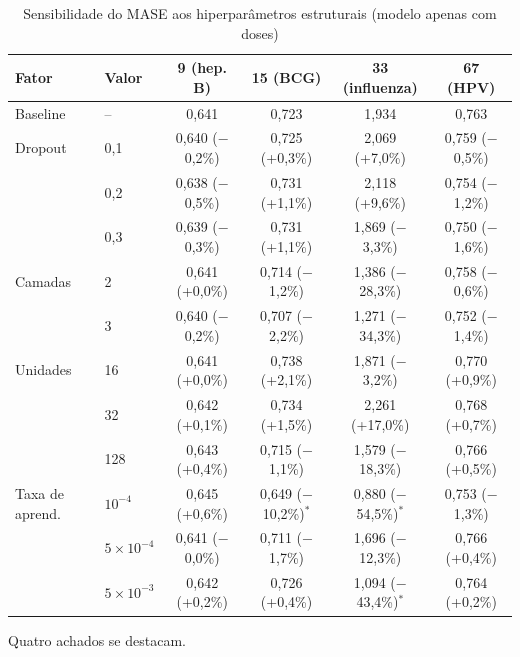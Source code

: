 \documentclass[
    12pt,
    openright,
    oneside,
    a4paper,
    english,
    brazil
]{abntex2}
\begin{document}
\begin{table}[htb]
  \centering
  \caption{Sensibilidade do MASE aos hiperparâmetros estruturais (modelo apenas com doses)}
  \label{tab:sens_estrutural}
  \footnotesize
  \setlength{\tabcolsep}{3pt}
  \begin{tabular}{llcccc}
    \toprule
    \textbf{Fator} & \textbf{Valor} & \textbf{9 (hep. B)} & \textbf{15 (BCG)} & \textbf{33 (influenza)} & \textbf{67 (HPV)} \\
    \midrule
    Baseline & -- & 0,641 & 0,723 & 1,934 & 0,763 \\
    \midrule
    Dropout & 0,1 & 0,640 ($-$0,2\%) & 0,725 (+0,3\%) & 2,069 (+7,0\%) & 0,759 ($-$0,5\%) \\
     & 0,2 & 0,638 ($-$0,5\%) & 0,731 (+1,1\%) & 2,118 (+9,6\%) & 0,754 ($-$1,2\%) \\
     & 0,3 & 0,639 ($-$0,3\%) & 0,731 (+1,1\%) & 1,869 ($-$3,3\%) & 0,750 ($-$1,6\%) \\
    \midrule
    Camadas & 2 & 0,641 (+0,0\%) & 0,714 ($-$1,2\%) & 1,386 ($-$28,3\%) & 0,758 ($-$0,6\%) \\
     & 3 & 0,640 ($-$0,2\%) & 0,707 ($-$2,2\%) & 1,271 ($-$34,3\%) & 0,752 ($-$1,4\%) \\
    \midrule
    Unidades & 16 & 0,641 (+0,0\%) & 0,738 (+2,1\%) & 1,871 ($-$3,2\%) & 0,770 (+0,9\%) \\
     & 32 & 0,642 (+0,1\%) & 0,734 (+1,5\%) & 2,261 (+17,0\%) & 0,768 (+0,7\%) \\
     & 128 & 0,643 (+0,4\%) & 0,715 ($-$1,1\%) & 1,579 ($-$18,3\%) & 0,766 (+0,5\%) \\
    \midrule
    Taxa de aprend. & $10^{-4}$ & 0,645 (+0,6\%) & 0,649 ($-$10,2\%)$^{*}$ & 0,880 ($-$54,5\%)$^{*}$ & 0,753 ($-$1,3\%) \\
     & $5\times10^{-4}$ & 0,641 ($-$0,0\%) & 0,711 ($-$1,7\%) & 1,696 ($-$12,3\%) & 0,766 (+0,4\%) \\
     & $5\times10^{-3}$ & 0,642 (+0,2\%) & 0,726 (+0,4\%) & 1,094 ($-$43,4\%)$^{*}$ & 0,764 (+0,2\%) \\
    \bottomrule
  \end{tabular}
\end{table}

Quatro achados se destacam.
\end{document}
